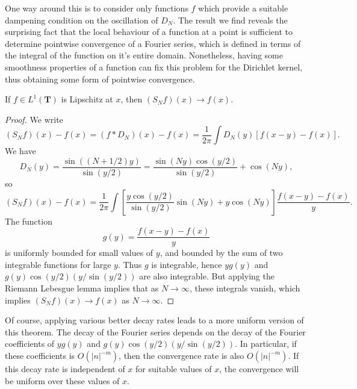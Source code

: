 One way around this is to consider only functions $f$ which provide a suitable dampening condition on the oscillation of $D_N$. The result we find reveals the surprising fact that the local behaviour of a function at a point is sufficient to determine pointwise convergence of a Fourier series, which is defined in terms of the integral of the function on it's entire domain. Nonetheless, having some smoothness properties of a function can fix this problem for the Dirichlet kernel, thus obtaining some form of pointwise convergence.

\begin{theorem}
	If $f \in L^1(\mathbf{T})$ is Lipschitz at $x$, then $(S_N f)(x) \to f(x)$.
\end{theorem}
\begin{proof}
	We write
	\[ (S_N f)(x) - f(x) = (f * D_N)(x) - f(x) = \frac{1}{2\pi} \int D_N(y) [f(x-y) - f(x)]. \]
	We have
	\[ D_N(y) = \frac{\sin((N + 1/2)y)}{\sin(y/2)} = \frac{\sin(Ny) \cos(y/2)}{\sin(y/2)} + \cos(Ny), \]
	so
	\[ (S_N f)(x) - f(x) = \frac{1}{2\pi} \int \left[ \frac{y \cos(y/2)}{\sin(y/2)} \sin(Ny) + y \cos(Ny) \right] \frac{f(x-y) - f(x)}{y}. \]
	The function
	\[ g(y) = \frac{f(x-y) - f(x)}{y} \]
	is uniformly bounded for small values of $y$, and bounded by the sum of two integrable functions for large $y$. Thus $g$ is integrable, hence $yg(y)$ and $g(y) \cos(y/2)(y/\sin(y/2))$ are also integrable. But applying the Riemann Lebesgue lemma implies that as $N \to \infty$, these integrals vanish, which implies $(S_N f)(x) \to f(x)$ as $N \to \infty$.
\end{proof}

Of course, applying various better decay rates leads to a more uniform version of this theorem. The decay of the Fourier series depends on the decay of the Fourier coefficients of $yg(y)$ and $g(y) \cos(y/2)(y/\sin(y/2))$. In particular, if these coefficients is $O(|n|^{-m})$, then the convergence rate is also $O(|n|^{-m})$. If this decay rate is independent of $x$ for suitable values of $x$, the convergence will be uniform over these values of $x$.

